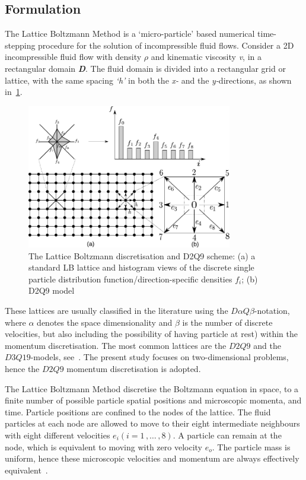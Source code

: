 \subsection{Formulation}

The Lattice Boltzmann Method is a `micro-particle' based numerical 
time-stepping procedure for the solution of incompressible fluid flows. 
Consider a 2D incompressible fluid flow with density $\rho$ and kinematic 
viscosity \textit{v}, in a rectangular domain \textit{\textbf{D}}. The fluid 
domain is divided into a rectangular grid or lattice, with the same spacing 
\textit{`h'} in both the \textit{x-} and the \textit{y-}directions, as shown 
in~\cref{fig:D2Q9}. 

\begin{figure}[htpb]
	\centering
	\includegraphics[width=0.8\textwidth]{D2Q9}
	\caption[The Lattice Boltzmann discretisation and D2Q9 scheme]{The Lattice 
	Boltzmann discretisation and D2Q9 scheme: (a) a standard LB lattice and 
	histogram views of the discrete single particle distribution 
	function/direction-specific densities $f_i$; (b) D2Q9 model}
	\label{fig:D2Q9}
\end{figure}

These lattices are usually classified in the literature using the 
$\mathit{D}\alpha\mathit{Q}\beta$-notation, where $\alpha$ denotes the space 
dimensionality and $\beta$ is the number of discrete velocities, but also 
including the possibility of having particle at rest) within the momentum 
discretisation. The most common lattices are the $\mathit{D2Q9}$ and the 
$\mathit{D3Q19}$-models, see~\citet{He1997}. The present study focuses on 
two-dimensional problems, hence the $\mathit{D2Q9}$ momentum discretisation is 
adopted.

The Lattice Boltzmann Method discretise the Boltzmann equation in space, to a 
finite number of possible particle spatial positions and microscopic momenta, 
and time. Particle positions are confined to the nodes of the lattice. The 
fluid particles at each node are allowed to move to their eight intermediate 
neighbours with eight different velocities $\mathit{e_i} 
(\mathit{i}=1\,,\dots\,,8)$. A particle can remain at the node, which is 
equivalent to moving with zero velocity $\mathit{e_o}$. The particle mass is 
uniform, hence these microscopic velocities and momentum are always effectively 
equivalent~\citep{Han2007a}.

